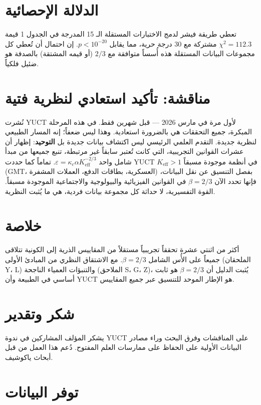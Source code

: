 \documentclass[11pt,a4paper]{article}
\newcommand{\betaf}{\beta}
\begin{document}
	\section{الدلالة الإحصائية}
	
	تعطي طريقة فيشر لدمج الاختبارات المستقلة الـ 15 المدرجة في الجدول 1 قيمة \(\chi^2 = 112.3\) مشتركة مع 30 درجة حرية، مما يقابل \(p < 10^{-20}\). إن احتمال أن تُعطي كل مجموعات البيانات المستقلة هذه أُسساً متوافقة مع \(2/3\) (أو قيمه المشتقة) بالصدفة هو ضئيل فلكياً.
	
	\section{مناقشة: تأكيد استعادي لنظرية فتية}
	
	نُشرت YUCT لأول مرة في مارس 2026 — قبل شهرين فقط. في هذه المرحلة المبكرة، جميع التحققات هي بالضرورة استعادية. وهذا ليس ضعفاً؛ إنه المسار الطبيعي لنظرية جديدة. التقدم العلمي الرئيسي ليس اكتشاف بيانات جديدة بل \textbf{التوحيد}: إظهار أن عشرات القوانين التجريبية، التي كانت تُعتبر سابقاً غير مرتبطة، تنبع جميعها من مبدأ شامل واحد \(\varepsilon = \kappa_c \alpha K_{\mathrm{eff}}^{-2/3}\). تماماً كما حددت YUCT \(K_{\mathrm{eff}} > 1\) في أنظمة موجودة مسبقاً (GMT، العسكرية، بطاقات الدفع، العملات المشفرة) بفصل التنسيق عن نقل البيانات، فإنها تحدد الآن \(\beta = 2/3\) في القوانين الفيزيائية والبيولوجية والاجتماعية الموجودة مسبقاً. القوة التفسيرية، لا حداثة كل مجموعة بيانات فردية، هي ما يُثبت النظرية.
	
	\section{خلاصة}
	
	أكثر من اثنتي عشرة تحققاً تجريبياً مستقلاً من المقاييس الذرية إلى الكونية تتلاقى جميعاً على الأُس الشامل \(\betaf = 2/3\). مع الاشتقاق النظري من المبادئ الأولى (الملحقان Y، L) والتنبؤات العمياء الناجحة (الملاحق S، G، Z)، يُثبت الدليل أن \(\betaf = 2/3\) هو ثابت أساسي في الطبيعة وأن YUCT هو الإطار الموحد للتنسيق عبر جميع المقاييس.
	
	\section*{شكر وتقدير}
	
	يشكر المؤلف المشاركين في ندوة YUCT على المناقشات وفرق البحث وراء مصادر البيانات الأولية على الحفاظ على ممارسات العلم المفتوح. دُعم هذا العمل من قبل أبحاث ياكوشيف.
	
	\section*{توفر البيانات}
	
\end{document}
